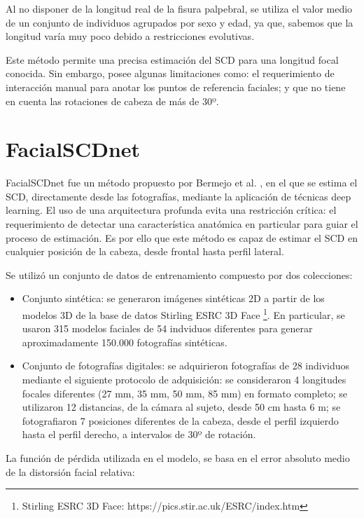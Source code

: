 Al no disponer de la longitud real de la fisura palpebral, se utiliza el valor medio de un conjunto de individuos agrupados por sexo y edad, ya que, sabemos que la longitud varía muy poco debido a restricciones evolutivas.

Este método permite una precisa estimación del SCD para una longitud focal conocida. Sin embargo, posee algunas limitaciones como: el requerimiento de interacción manual para anotar los puntos de referencia faciales; y que no tiene en cuenta las rotaciones de cabeza de más de 30º.

\section{FacialSCDnet}

FacialSCDnet fue un método propuesto por Bermejo et al. \cite{14}, en el que se estima el SCD, directamente desde las fotografías, mediante la aplicación de técnicas deep learning. El uso de una arquitectura profunda evita una restricción crítica: el requerimiento de detectar una característica anatómica en particular para guiar el proceso de estimación. Es por ello que este método es capaz de estimar el SCD en cualquier posición de la cabeza, desde frontal hasta perfil lateral.

Se utilizó un conjunto de datos de entrenamiento compuesto por dos colecciones: 

\begin{itemize}
	\item Conjunto sintética: se generaron imágenes sintéticas 2D a partir de los modelos 3D de la base de datos Stirling ESRC 3D Face \footnote{Stirling ESRC 3D Face: https://pics.stir.ac.uk/ESRC/index.htm}. En particular, se usaron 315 modelos faciales de 54 indviduos diferentes para generar aproximadamente 150.000 fotografías sintéticas.
	\item Conjunto de fotografías digitales: se adquirieron fotografías de 28 individuos mediante el siguiente protocolo de adquisición: se consideraron 4 longitudes focales diferentes (27 mm, 35 mm, 50 mm, 85 mm) en formato completo; se utilizaron 12 distancias, de la cámara al sujeto, desde 50 cm hasta 6 m; se fotografiaron 7 posiciones diferentes de la cabeza, desde el perfil izquierdo hasta el perfil derecho, a intervalos de 30º de rotación.
\end{itemize}

La función de pérdida utilizada en el modelo, se basa en el error absoluto medio de la distorsión facial relativa:

